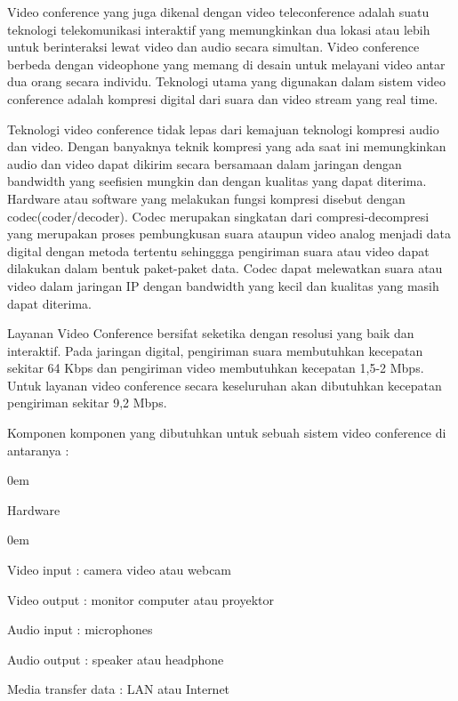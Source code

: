 \documentclass{jtetiproposalskripsi}
\begin{document}
Video conference yang juga dikenal dengan video teleconference adalah suatu teknologi telekomunikasi interaktif yang memungkinkan dua lokasi atau lebih untuk berinteraksi lewat video dan audio secara simultan. Video conference berbeda dengan videophone yang memang di desain untuk melayani video antar dua orang secara individu. Teknologi utama yang digunakan dalam sistem video conference adalah kompresi digital dari suara dan video stream yang real time.

Teknologi video conference tidak lepas dari kemajuan teknologi kompresi audio dan video. Dengan banyaknya teknik kompresi yang ada saat ini memungkinkan audio dan video dapat dikirim secara bersamaan dalam jaringan dengan bandwidth yang seefisien mungkin dan dengan kualitas yang dapat diterima. Hardware atau software yang melakukan fungsi kompresi disebut dengan codec(coder/decoder). Codec merupakan singkatan dari compresi-decompresi yang merupakan proses pembungkusan suara ataupun video analog menjadi data digital dengan metoda tertentu sehinggga pengiriman suara atau video dapat dilakukan dalam bentuk paket-paket data. Codec dapat melewatkan suara atau video dalam jaringan IP dengan bandwidth yang kecil dan kualitas yang masih dapat diterima.

Layanan Video Conference bersifat seketika dengan resolusi yang baik dan interaktif. Pada jaringan digital, pengiriman suara membutuhkan kecepatan sekitar 64 Kbps dan pengiriman video membutuhkan kecepatan 1,5-2 Mbps. Untuk layanan video conference secara keseluruhan akan dibutuhkan kecepatan pengiriman sekitar 9,2 Mbps.

Komponen komponen yang dibutuhkan untuk sebuah sistem video conference di antaranya :
\vspace{-0.5cm}
\begin{enumerate}[1.]
\begin{singlespace}
\itemsep0em
\item Hardware
\end{singlespace}
\end{enumerate}

\begin{enumerate}[a.]
\begin{singlespace}
\itemsep0em
\item Video input : camera video atau webcam
\item Video output : monitor computer atau proyektor
\item Audio input : microphones
\item Audio output : speaker atau headphone
\item Media transfer data : LAN atau Internet
\end{singlespace}
\end{enumerate}
\end{document}
